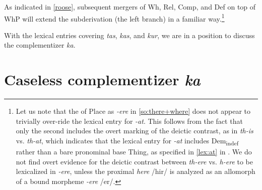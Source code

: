 \noindent As indicated in \ref{roose}, subsequent mergers of Wh, Rel, Comp, and Def on top of WhP will extend the subderivation (the left branch) in a familiar way.\footnote{Let us note that the  of Place as \textit{-ere} in \ref{so:there+where} does not appear to trivially over-ride  the lexical entry for \textit{-at}. This follows from the fact that only the second includes the overt marking of the deictic contrast, as in \textit{th-is} vs. \textit{th-at}, which indicates that the lexical entry for \textit{-at} includes Dem\textsubscript{indef} rather than a bare pronominal base Thing, as specified in \ref{lex:at} in . We do not find overt evidence for the deictic contrast between \textit{th-ere} vs. \textit{h-ere} to be lexicalized in \textit{-ere}, unless the proximal \textit{here} /hir/ is analyzed as an allomorph  of a bound morpheme \textit{-ere} /er/.  
}%
\par
 With the lexical entries covering \textit{tas}, \textit{kas}, and \textit{kur}, we are in a position to discuss the  complementizer \textit{ka}. 


\section{Caseless complementizer \textit{ka}}

